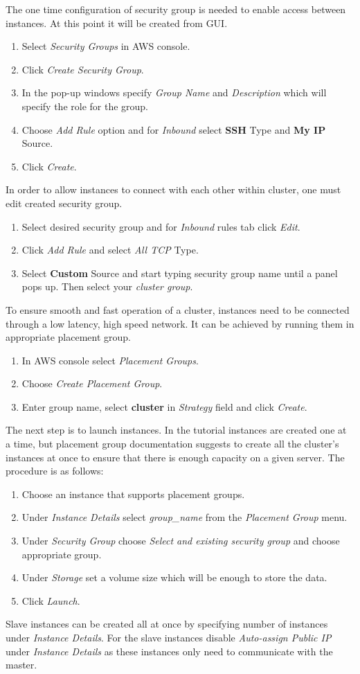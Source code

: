 \documentclass[11pt,english]{article}
\begin{document}
The one time configuration of security group is needed to enable access between instances. At this point it will be created from GUI.
\begin{enumerate}
	\item Select \textit{Security Groups} in AWS console.
	\item Click \textit{Create Security Group}.
	\item In the pop-up windows specify \textit{Group Name} and \textit{Description} which will specify the role for the group.
	\item Choose \textit{Add Rule} option and for \textit{Inbound} select \textbf{SSH} Type and \textbf{My IP} Source.
	\item Click \textit{Create}.
\end{enumerate}
In order to allow instances to connect with each other within cluster, one must edit created security group.
\begin{enumerate}
	\item Select desired security group and for \textit{Inbound} rules tab click \textit{Edit}.
	\item Click \textit{Add Rule} and select \textit{All TCP} Type.
	\item Select \textbf{Custom} Source and start typing security group name until a panel pops up. Then select your \textit{cluster group}.
\end{enumerate}
To ensure smooth and fast operation of a cluster, instances need to be connected through a low latency, high speed network. It can be achieved by running them in appropriate placement group.
\begin{enumerate}
	\item In AWS console select \textit{Placement Groups}.
	\item Choose \textit{Create Placement Group}.
	\item Enter group name, select \textbf{cluster} in \textit{Strategy} field and click \textit{Create}.
\end{enumerate}
The next step is to launch instances. In the tutorial instances are created one at a time, but placement group documentation suggests to create all the cluster's instances at once to ensure that there is enough capacity on a given server. The procedure is as follows:
\begin{enumerate}
	\item Choose an instance that supports placement groups.
	\item Under \textit{Instance Details} select \textit{group\_name} from the \textit{Placement Group} menu.
	\item Under \textit{Security Group} choose \textit{Select and existing security group} and choose appropriate group.
	\item Under \textit{Storage} set a volume size which will be enough to store the data.
	\item Click \textit{Launch}.
\end{enumerate}
Slave instances can be created all at once by specifying number of instances under \textit{Instance Details}. For the slave instances disable \textit{Auto-assign Public IP} under \textit{Instance Details} as these instances only need to communicate with the master.
\end{document}
